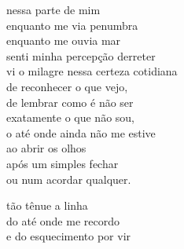nessa parte de mim\\
enquanto me via penumbra\\
enquanto me ouvia mar\\
senti minha percepção derreter\\
vi o milagre nessa certeza cotidiana\\
de reconhecer o que vejo,\\
de lembrar como é não ser\\
exatamente o que não sou,\\
o até onde ainda não me estive\\
ao abrir os olhos\\
após um simples fechar\\
ou num acordar qualquer.

tão tênue a linha\\
do até onde me recordo\\
e do esquecimento por vir
